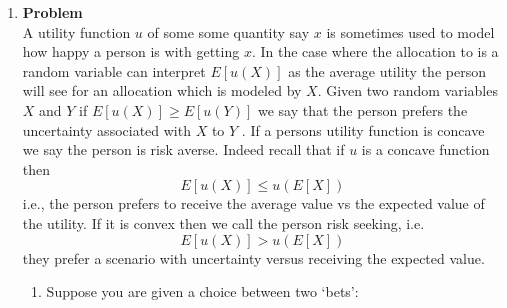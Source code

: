 \documentclass[12pt]{article}
\newenvironment{Ex}{\textbf{Problem}\vspace{.75em}\\}{}
\begin{document}
\begin{enumerate}
\begin{Ex}
      indeed true. In this problem we consider this further in the
      case of convex functions. A function is convex if for all $x, y
      \in R$ and for any $\lambda \in [0, 1]$ we have that
      $$ g(\lambda x + (1-\lambda)y) \le \lambda g(x) +
      (1-\lambda)g(y)$$
      If $-g$ is convex, then we say that $g$ is concave.
      \begin{enumerate}
      \item Use the above definition to draw a representative convex
        and concave functions.
      \item Suppose $X$ is a discrete random variable that takes two
        values only and $g$ is convex. Show that $E[g(X)] \ge
        g(E[X])$. It follows that if $g$ is concave then $E[g(X)] \le
        g(E[X])$.
      \item This result is true in general, i.e., for any kind of
        random variable. To convince yourself, can you extend this
        result to the case $X$ a discrete random variables that takes
        three values? Hint: you could perhaps condition...
      \end{enumerate}
      \begin{solution} \hfill \\
        {\huge TODO}
      \end{solution}
    \end{Ex}
  \item
    \begin{Ex}
      A utility function $u$ of some some quantity say $x$ is sometimes
      used to model how happy a person is with getting $x$. In the case
      where the allocation to is a random variable can interpret
      $E[u(X)]$ as the average utility the person will see for an
      allocation which is modeled by $X$. Given two random variables $X$
      and $Y$ if $E [u(X)] \ge E [u(Y)]$ we say that the person prefers
      the uncertainty associated with $X$ to $Y$ . If a persons utility
      function is concave we say the person is risk averse. Indeed
      recall that if $u$ is a concave function then
      $$ E[u(X)] \le u(E[X]) $$
      i.e., the person prefers to receive the average value vs the
      expected value of the utility. If it is convex then we call the
      person risk seeking, i.e.
      $$ E[u(X)] \gt u(E[X]) $$
      they prefer a scenario with uncertainty versus receiving the expected value.
      \begin{enumerate}
      \item Suppose you are given a choice between two `bets':

\end{enumerate}
\end{Ex}
\end{enumerate}
\end{document}
